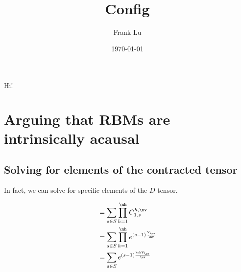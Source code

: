 \documentclass[11pt]{article}
\author{Frank Lu}
\date{\today}
\title{Config}
\begin{document}
\maketitle
\tableofcontents

\newcommand{\nH}{n_H}
\newcommand{\nV}{n_V}
\newcommand{\NH}{N_H}
\newcommand{\NV}{N_V}

\newcommand{\as}{a_1a_2 \dots a_{\nh}}
\newcommand{\ones}{1, 1, \dots, 1}
\newcommand{\ks}{k_1k_2 \dots b_{\nh}}

\newsavebox{\mybox}
\newenvironment{Notes}
{\begin{lrbox}{\mybox}\begin{minipage}{\textwidth}}
{\end{minipage}\end{lrbox}\fbox{\usebox{\mybox}}\\}

Hi!

\section{Arguing that RBMs are intrinsically acausal}
\label{sec:orgec442dd}
\subsection{Solving for elements of the contracted tensor}
\label{sec:orgaffba52}

\begin{Notes}
In fact, we can solve for specific elements of the \(D\) tensor.

\begin{align}
    &= \sum_{s \in S} \prod_{h=1}^{\nh} C^{h,\nv}_{1, s} \label{correction} \\
    &= \sum_{s \in S} \prod_{h=1}^{\nh} e^{ (s -1) \frac{V_{\nv}}{\nv} } \\
    &= \sum_{s \in S} e^{ (s -1) \frac{\nh V_{\nv}}{\nv} }
\end{align}

\end{Notes}
\end{document}
